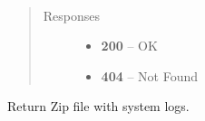\documentclass[letterpaper,10pt,english]{sphinxmanual}
\begin{document}
\begin{fulllineitems}
\label{01_how_to_use_it:method-get-logs-system}~\begin{quote}\begin{description}
\item[{Responses}] \leavevmode\begin{itemize}
\item {} 
\textbf{200} -- OK

\item {} 
\textbf{404} -- Not Found

\end{itemize}

\end{description}\end{quote}

Return Zip file with system logs.

\end{fulllineitems}

\end{document}
